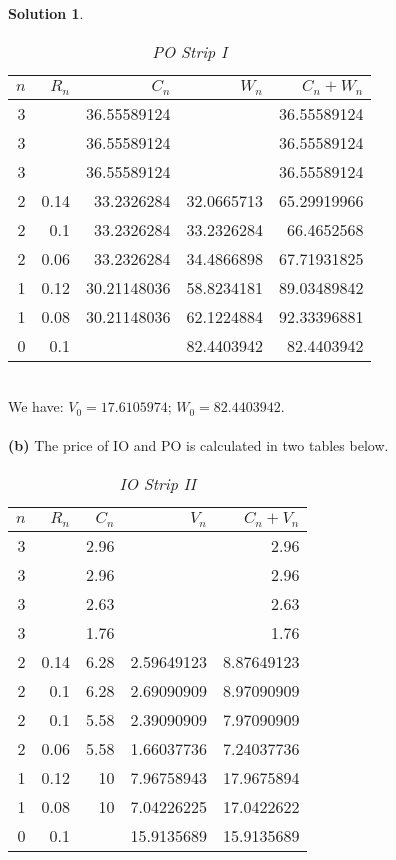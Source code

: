 \documentclass[a4paper, 10pt]{article}
\renewcommand{\arraystretch}{1.4}
\theoremstyle{definition}
\theoremstyle{hSol}
\newtheorem*{solution}{Solution}
\begin{document}
\begin{solution}
\begin{table}[H]
  \centering
  \caption{\textit{PO Strip I}}
  \vspace{-7pt}
  \def\arraystretch{1.15}
  \begin{tabular}{|r|rrrr|}
  \hline
  $n$ & $R_n$ & $C_n$ & $W_n$ & $C_n+W_n$\\
    \hline
    3     &       & 36.55589124 &       & 36.55589124 \\
    3     &       & 36.55589124 &       & 36.55589124 \\
    3     &       & 36.55589124 &       & 36.55589124 \\
    \hline
    2     & 0.14  & 33.2326284 & 32.0665713 & 65.29919966 \\
    2     & 0.1   & 33.2326284 & 33.2326284 & 66.4652568 \\
    2     & 0.06  & 33.2326284 & 34.4866898 & 67.71931825 \\
    \hline
    1     & 0.12  & 30.21148036 & 58.8234181 & 89.03489842 \\
    1     & 0.08  & 30.21148036 & 62.1224884 & 92.33396881 \\
    \hline
    0     & 0.1   &       & 82.4403942 &  82.4403942\\
    \hline
    \end{tabular}%
  \label{tab:addlabel}%
\end{table}%
~\\
We have: $V_0=  17.6105974$; $W_0 = 82.4403942$.\\
~\\
\textbf{(b)} The price of IO and PO is calculated in two tables below.
\begin{table}[H]
  \centering
  \caption{\textit{IO Strip II}}
  \vspace{-7pt}
  \def\arraystretch{1.15}
  \begin{tabular}{|r|rrrr|}
  \hline
  $n$ & $R_n$ & $C_n$ & $V_n$ & $C_n+V_n$\\
    \hline
    3     &       & 2.96  &       & 2.96 \\
    3     &       & 2.96  &       & 2.96 \\
    3     &       & 2.63  &       & 2.63 \\
    3     &       & 1.76  &       & 1.76 \\
    \hline
    2     & 0.14  & 6.28  & 2.59649123 & 8.87649123 \\
    2     & 0.1   & 6.28  & 2.69090909 & 8.97090909 \\
    2     & 0.1   & 5.58  & 2.39090909 & 7.97090909 \\
    2     & 0.06  & 5.58  & 1.66037736 & 7.24037736 \\
    \hline
    1     & 0.12  & 10    & 7.96758943 & 17.9675894 \\
    1     & 0.08  & 10    & 7.04226225 & 17.0422622 \\
    \hline
    0     & 0.1   &       & 15.9135689 & 15.9135689 \\
    \hline
    \end{tabular}%
  \label{tab:addlabel}%
\end{table}%


\end{solution}
\end{document}
